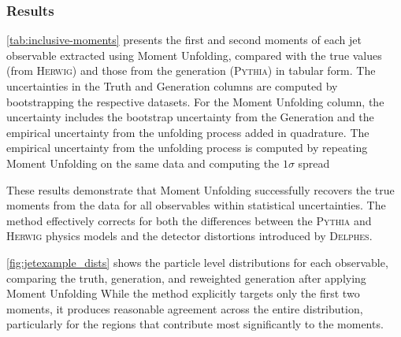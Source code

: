 \subsubsection{Results}

            \cref{tab:inclusive-moments} presents the first and second moments of each jet observable extracted using Moment Unfolding, compared with the true values (from \textsc{Herwig}) and those from the generation (\textsc{Pythia}) in tabular form.
            The uncertainties in the Truth and Generation columns are computed by bootstrapping the respective datasets.
            For the Moment Unfolding column, the uncertainty includes the bootstrap uncertainty from the Generation and the empirical uncertainty from the unfolding process added in quadrature.
            The empirical uncertainty from the unfolding process is computed by repeating Moment Unfolding on the same data and computing the \(1\sigma\) spread
            
            These results demonstrate that Moment Unfolding successfully recovers the true moments from the data for all observables within statistical uncertainties.
            The method effectively corrects for both the differences between the \textsc{Pythia} and \textsc{Herwig} physics models and the detector distortions introduced by \textsc{Delphes}.

            \cref{fig:jetexample_dists} shows the particle level distributions for each observable, comparing the truth, generation, and reweighted generation after applying Moment Unfolding
            While the method explicitly targets only the first two moments, it produces reasonable agreement across the entire distribution, particularly for the regions that contribute most significantly to the moments.

